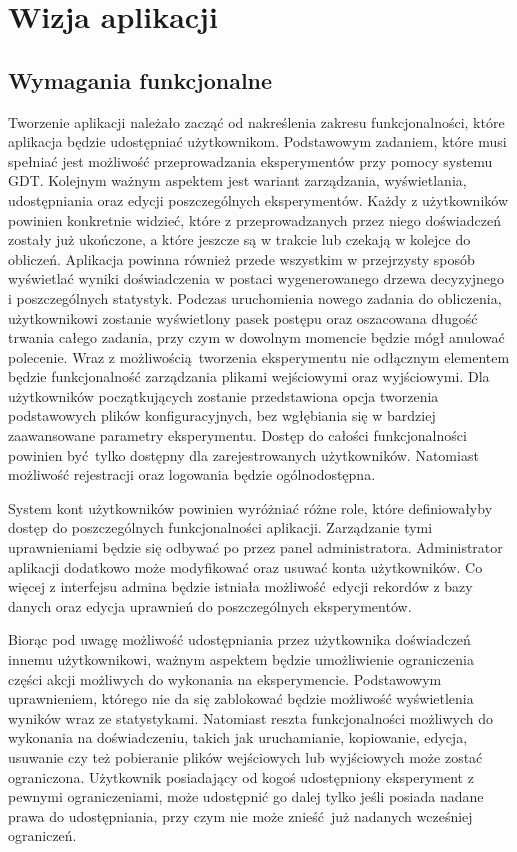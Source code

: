 \chapter{Wizja aplikacji}

\section{Wymagania funkcjonalne}
Tworzenie aplikacji należało zacząć od nakreślenia zakresu funkcjonalności, które aplikacja będzie udostępniać użytkownikom. Podstawowym zadaniem, które musi spełniać jest możliwość przeprowadzania eksperymentów przy pomocy systemu GDT. Kolejnym ważnym aspektem jest wariant zarządzania, wyświetlania, udostępniania oraz edycji poszczególnych eksperymentów. Każdy z użytkowników powinien konkretnie widzieć, które z przeprowadzanych przez niego doświadczeń zostały już ukończone, a które jeszcze są w trakcie lub czekają w kolejce do obliczeń. Aplikacja powinna również przede wszystkim w przejrzysty sposób wyświetlać wyniki doświadczenia w postaci wygenerowanego drzewa decyzyjnego i poszczególnych statystyk. Podczas uruchomienia nowego zadania do obliczenia, użytkownikowi zostanie wyświetlony pasek postępu oraz oszacowana długość trwania całego zadania, przy czym w dowolnym momencie będzie mógł anulować polecenie.  Wraz z możliwością tworzenia eksperymentu nie odłącznym elementem będzie funkcjonalność zarządzania plikami wejściowymi oraz wyjściowymi. Dla użytkowników początkujących zostanie przedstawiona opcja tworzenia podstawowych plików konfiguracyjnych, bez wgłębiania się w bardziej zaawansowane parametry eksperymentu. Dostęp do całości funkcjonalności powinien być tylko dostępny dla zarejestrowanych użytkowników. Natomiast możliwość rejestracji oraz logowania będzie ogólnodostępna.

System kont użytkowników powinien wyróżniać różne role, które definiowałyby dostęp do poszczególnych funkcjonalności aplikacji. Zarządzanie tymi uprawnieniami będzie się odbywać po przez panel administratora. Administrator aplikacji dodatkowo może modyfikować oraz usuwać konta użytkowników. Co więcej z interfejsu admina będzie istniała możliwość edycji rekordów z bazy danych oraz edycja uprawnień do poszczególnych eksperymentów. 

Biorąc pod uwagę możliwość udostępniania przez użytkownika doświadczeń innemu użytkownikowi, ważnym aspektem będzie umożliwienie ograniczenia części akcji możliwych do wykonania na eksperymencie. Podstawowym uprawnieniem, którego nie da się zablokować będzie możliwość wyświetlenia wyników wraz ze statystykami. Natomiast reszta funkcjonalności możliwych do wykonania na doświadczeniu, takich jak uruchamianie, kopiowanie, edycja, usuwanie czy też pobieranie plików wejściowych lub wyjściowych może zostać ograniczona. Użytkownik posiadający od kogoś udostępniony eksperyment z pewnymi ograniczeniami, może udostępnić go dalej tylko jeśli posiada nadane prawa do udostępniania, przy czym nie może znieść już nadanych wcześniej ograniczeń.


